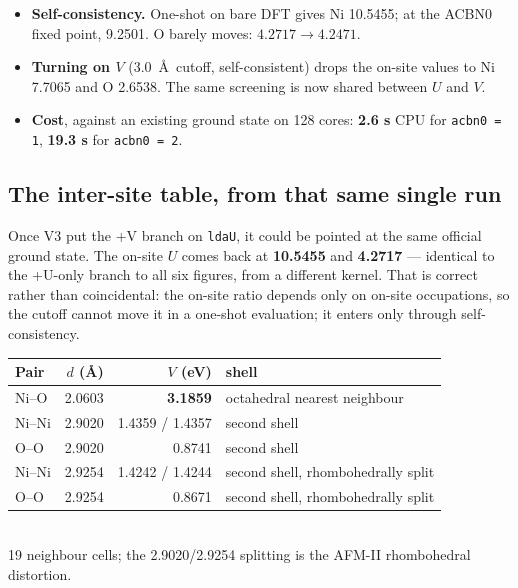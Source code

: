 \documentclass[11pt,a4paper]{article}
\newcommand{\C}[1]{\texttt{\small #1}}
\begin{document}
\begin{itemize}[leftmargin=1.3em,itemsep=2pt]
\item \textbf{Self-consistency.} One-shot on bare DFT gives Ni 10.5455; at the
      ACBN0 fixed point, 9.2501. O barely moves: $4.2717 \to 4.2471$.
\item \textbf{Turning on $V$} (3.0~\AA\ cutoff, self-consistent) drops the
      on-site values to Ni 7.7065 and O 2.6538. The same screening is now shared
      between $U$ and $V$.
\item \textbf{Cost}, against an existing ground state on 128 cores:
      \textbf{2.6 s} CPU for \C{acbn0 = 1}, \textbf{19.3 s} for \C{acbn0 = 2}.
\end{itemize}

\subsection{The inter-site table, from that same single run}

Once V3 put the +V branch on \C{ldaU}, it could be pointed at the same official
ground state. The on-site $U$ comes back at \textbf{10.5455} and
\textbf{4.2717} --- identical to the +U-only branch to all six figures, from a
different kernel. That is correct rather than coincidental: the on-site ratio
depends only on on-site occupations, so the cutoff cannot move it in a one-shot
evaluation; it enters only through self-consistency.

\begin{center}\small
\begin{tabular}{lrrl}
\toprule
Pair & $d$ (\AA) & $V$ (eV) & shell \\
\midrule
Ni--O  & 2.0603 & \textbf{3.1859} & octahedral nearest neighbour \\
\midrule
Ni--Ni & 2.9020 & 1.4359 / 1.4357 & second shell \\
O--O   & 2.9020 & 0.8741          & second shell \\
Ni--Ni & 2.9254 & 1.4242 / 1.4244 & second shell, rhombohedrally split \\
O--O   & 2.9254 & 0.8671          & second shell, rhombohedrally split \\
\bottomrule
\end{tabular}\\[2pt]
{\footnotesize\color{mute} 19 neighbour cells; the 2.9020/2.9254 splitting is the AFM-II rhombohedral distortion.}
\end{center}

\end{document}

